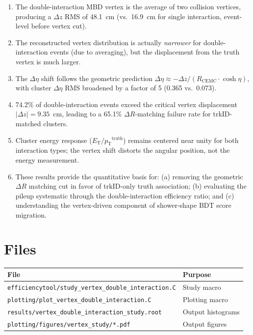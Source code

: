 \documentclass[11pt,letterpaper]{article}
\newcommand{\DR}{\ensuremath{\Delta R}}
\newcommand{\pT}{\ensuremath{p_{\text{T}}}}
\newcommand{\ET}{\ensuremath{E_{\text{T}}}}
\newcommand{\Rcemc}{\ensuremath{R_{\text{CEMC}}}}
\begin{document}
\begin{enumerate}
  \item The double-interaction MBD vertex is the average of two
    collision vertices, producing a $\Delta z$ RMS of 48.1~cm (vs.\
    16.9~cm for single interaction, event-level before vertex cut).

  \item The reconstructed vertex distribution is actually \emph{narrower}
    for double-interaction events (due to averaging), but the
    displacement from the truth vertex is much larger.

  \item The $\Delta\eta$ shift follows the geometric prediction
    $\Delta\eta \approx -\Delta z / (\Rcemc \cdot \cosh\eta)$,
    with cluster $\Delta\eta$ RMS broadened by a factor of 5
    (0.365 vs.\ 0.073).

  \item 74.2\% of double-interaction events exceed the critical
    vertex displacement $|\Delta z| = 9.35$~cm, leading to a
    65.1\% $\DR$-matching failure rate for trkID-matched clusters.

  \item Cluster energy response ($\ET / \pT^{\text{truth}}$) remains
    centered near unity for both interaction types; the vertex shift
    distorts the angular position, not the energy measurement.

  \item These results provide the quantitative basis for:
    (a) removing the geometric $\DR$ matching cut in favor of
    trkID-only truth association;
    (b) evaluating the pileup systematic through the double-interaction
    efficiency ratio; and
    (c) understanding the vertex-driven component of shower-shape
    BDT score migration.
\end{enumerate}

\section*{Files}
\label{sec:files}

\begin{tabular}{ll}
\toprule
\textbf{File} & \textbf{Purpose} \\
\midrule
\texttt{efficiencytool/study\_vertex\_double\_interaction.C} & Study macro \\
\texttt{plotting/plot\_vertex\_double\_interaction.C} & Plotting macro \\
\texttt{results/vertex\_double\_interaction\_study.root} & Output histograms \\
\texttt{plotting/figures/vertex\_study/*.pdf} & Output figures \\
\bottomrule
\end{tabular}
\end{document}
